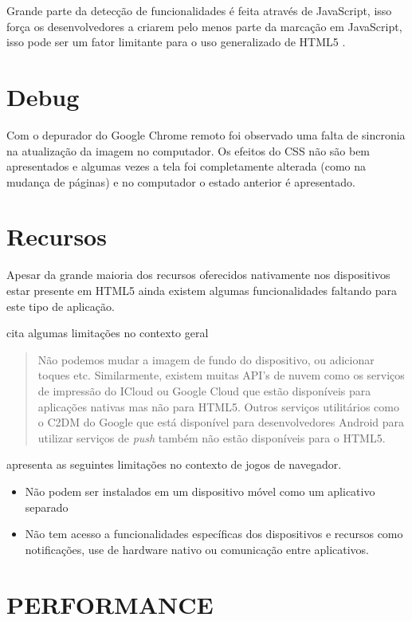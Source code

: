 \begin{draft}
Grande parte da detecção de funcionalidades é feita através de
JavaScript, isso força os desenvolvedores a criarem pelo menos parte da
marcação em JavaScript, isso pode ser um fator limitante para o uso
generalizado de HTML5 \autocite{diveIntohtml}.

\section{Debug}

Com o depurador do Google Chrome remoto foi observado uma falta de sincronia
na atualização da imagem no computador. Os efeitos do CSS não são bem apresentados
e algumas vezes a tela foi completamente alterada (como na mudança de páginas)
e no computador o estado anterior é apresentado.

\section{Recursos}

Apesar da grande maioria dos recursos oferecidos nativamente
nos dispositivos estar presente em HTML5 ainda existem algumas
funcionalidades faltando para este tipo de aplicação.

\cite{html5Tradeoffs} cita algumas limitações no contexto geral
\begin{quote}
Não podemos mudar a imagem de fundo do dispositivo, ou adicionar toques
etc. Similarmente, existem muitas API's de nuvem como os serviços
de impressão do ICloud ou Google Cloud que estão disponíveis para
aplicações nativas mas não para HTML5. Outros serviços utilitários
como o C2DM do Google que está disponível para desenvolvedores Android
para utilizar serviços de \textit{push} também não estão disponíveis
para o HTML5.
\end{quote}

\cite{browserGamesTechnologyAndFuture} apresenta as seguintes limitações
no contexto de jogos de navegador.

\begin{itemize}
\item Não podem ser instalados em um dispositivo móvel como um aplicativo separado
\item Não tem acesso a funcionalidades específicas dos dispositivos e recursos como notificações, use de hardware nativo ou comunicação entre aplicativos.
\end{itemize}

\section{PERFORMANCE}


\end{draft}
